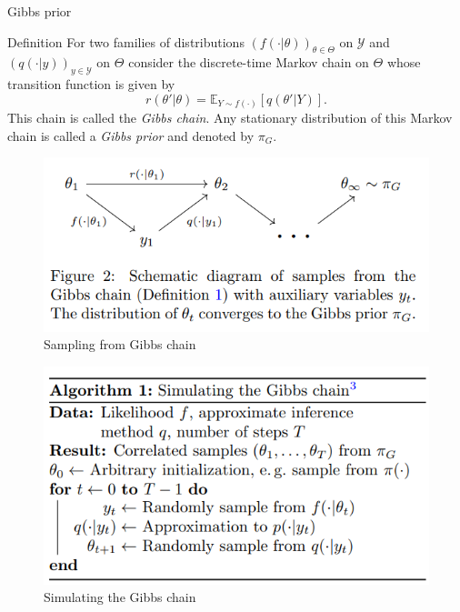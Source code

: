 \documentclass{beamer}
\begin{document}
	
	\begin{frame}{Gibbs prior}
		
	\begin{block}{Definition}
		For two families of distributions \( (f(\cdot|\theta))_{\theta \in \Theta} \) on \( \mathcal{Y} \) and \( (q(\cdot|y))_{y \in \mathcal{Y}} \) on \( \Theta \) consider the discrete-time Markov chain on \( \Theta \) whose transition function is given by
		\[ r(\theta'|\theta) = \mathbb{E}_{Y \sim f(\cdot)}[q(\theta'|Y)]. \]
		This chain is called the \textit{Gibbs chain}. Any stationary distribution of this Markov chain is called a \textit{Gibbs prior} and denoted by \( \pi_G \).
	\end{block}

	\begin{multicols}{2}
		\begin{figure}[bhtp]
			\includegraphics[width=\linewidth]{sampling-schema.png}
			\caption{Sampling from Gibbs chain}
		\end{figure}
		
		\begin{figure}[bhtp]
			\includegraphics[width=\linewidth]{algo.png}
			\caption{Simulating the Gibbs chain}
		\end{figure}
	\end{multicols}	
	\end{frame}
	
\end{document}
